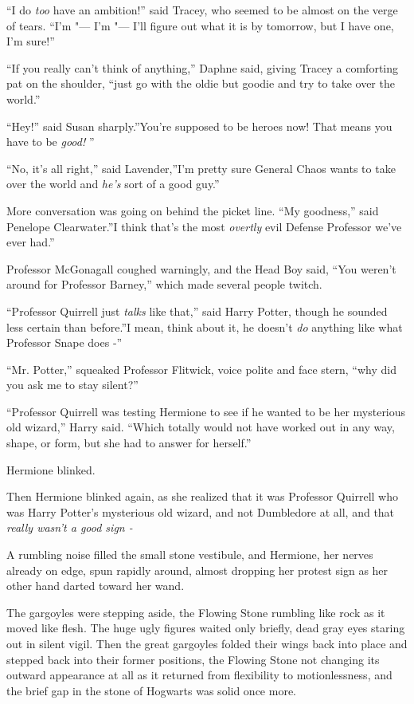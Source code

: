 ``I do \emph{too} have an ambition!'' said Tracey, who seemed to be
almost on the verge of tears. ``I'm "--- I'm "--- I'll figure out what it is
by tomorrow, but I have one, I'm sure!''

``If you really can't think of anything,'' Daphne said, giving Tracey a
comforting pat on the shoulder, ``just go with the oldie but goodie and
try to take over the world.''

``Hey!'' said Susan sharply.''You're supposed to be heroes now! That
means you have to be \emph{good!} ''

``No, it's all right,'' said Lavender,''I'm pretty sure General Chaos
wants to take over the world and \emph{he's} sort of a good guy.''

More conversation was going on behind the picket line. ``My goodness,''
said Penelope Clearwater.''I think that's the most \emph{overtly} evil
Defense Professor we've ever had.''

Professor McGonagall coughed warningly, and the Head Boy said, ``You
weren't around for Professor Barney,'' which made several people twitch.

``Professor Quirrell just \emph{talks} like that,'' said Harry Potter,
though he sounded less certain than before.''I mean, think about it, he
doesn't \emph{do} anything like what Professor Snape does -''

``Mr. Potter,'' squeaked Professor Flitwick, voice polite and face
stern, ``why did you ask me to stay silent?''

``Professor Quirrell was testing Hermione to see if he wanted to be her
mysterious old wizard,'' Harry said. ``Which totally would not have
worked out in any way, shape, or form, but she had to answer for
herself.''

Hermione blinked.

Then Hermione blinked again, as she realized that it was Professor
Quirrell who was Harry Potter's mysterious old wizard, and not
Dumbledore at all, and that \emph{really wasn't a good sign -}

A rumbling noise filled the small stone vestibule, and Hermione, her
nerves already on edge, spun rapidly around, almost dropping her protest
sign as her other hand darted toward her wand.

The gargoyles were stepping aside, the Flowing Stone rumbling like rock
as it moved like flesh. The huge ugly figures waited only briefly, dead
gray eyes staring out in silent vigil. Then the great gargoyles folded
their wings back into place and stepped back into their former
positions, the Flowing Stone not changing its outward appearance at all
as it returned from flexibility to motionlessness, and the brief gap in
the stone of Hogwarts was solid once more.

